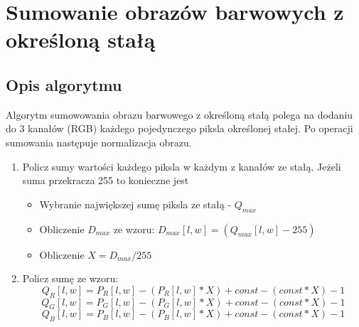 \documentclass[a4paper,12pt, titlepage]{report}
\begin{document}
\section{Sumowanie obrazów barwowych z określoną stałą}
\subsection*{Opis algorytmu}
\par Algorytm sumowowania obrazu barwowego z określoną stałą polega na dodaniu do 3 kanałów (RGB) każdego pojedynczego piksla określonej stałej. Po operacji sumowania następuje normalizacja obrazu.
\begin{enumerate}
\item Policz sumy wartości każdego piksla w każdym z kanałów ze stałą. Jeżeli suma przekracza 255 to konieczne jest
\begin{itemize}
\item Wybranie największej sumę piksla ze stałą - \(Q_{max}\) 
\item Obliczenie \(D_{max}\) ze wzoru: \(D_{max}[l,w]=(Q_{max}[l,w]-255)\)
\item Obliczenie \(X=D_{max}/255\)
\end{itemize}
\item Policz sumę ze wzoru: \[Q_{R}[l,w]=P_{R}[l,w]-(P_{R}[l, w]*X)+const-(const*X)-1\]\[Q_{G}[l,w]=P_{G}[l,w]-(P_{G}[l, w]*X)+const-(const*X)-1\]\[Q_{B}[l,w]=P_{B}[l,w]-(P_{B}[l, w]*X)+const-(const*X)-1\]
\end{enumerate}
\end{document}
